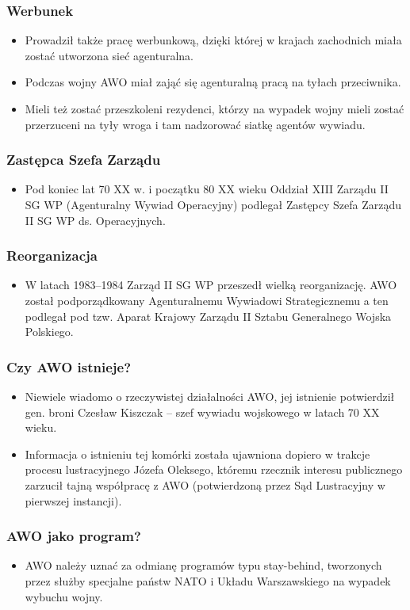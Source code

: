 \documentclass[]{beamer}
\begin{document}
\frame
{
\frametitle{Werbunek}
\begin{itemize}
\item  Prowadził także pracę werbunkową, dzięki której w krajach zachodnich miała zostać utworzona sieć agenturalna.
\item Podczas wojny AWO miał zająć się agenturalną pracą na tyłach przeciwnika.
\item Mieli też zostać przeszkoleni rezydenci, którzy na wypadek wojny mieli zostać przerzuceni na tyły wroga i tam nadzorować siatkę agentów wywiadu.
\end{itemize}
}



\frame
{
\frametitle{Zastępca Szefa Zarządu}
\begin{itemize}
\item Pod koniec lat 70 XX w. i początku 80 XX wieku Oddział XIII Zarządu II SG WP (Agenturalny Wywiad Operacyjny) podlegał Zastępcy Szefa Zarządu II SG WP ds. Operacyjnych.
\end{itemize}
}



\frame
{
\frametitle{Reorganizacja}
\begin{itemize}
\item W latach 1983–1984 Zarząd II SG WP przeszedł wielką reorganizację. AWO został podporządkowany Agenturalnemu Wywiadowi Strategicznemu a ten podlegał pod tzw. Aparat Krajowy Zarządu II Sztabu Generalnego Wojska Polskiego.
\end{itemize}
}



\frame
{
\frametitle{Czy AWO istnieje?}
\begin{itemize}
\item Niewiele wiadomo o rzeczywistej działalności AWO, jej istnienie potwierdził gen. broni Czesław Kiszczak – szef wywiadu wojskowego w latach 70 XX wieku.
\item Informacja o istnieniu tej komórki została ujawniona dopiero w trakcje procesu lustracyjnego Józefa Oleksego, któremu rzecznik interesu publicznego zarzucił tajną współpracę z AWO (potwierdzoną przez Sąd Lustracyjny w pierwszej instancji).
\end{itemize}
}



\frame
{
\frametitle{AWO jako program?}
\begin{itemize}
\item AWO należy uznać za odmianę programów typu stay-behind, tworzonych przez służby specjalne państw NATO i Układu Warszawskiego na wypadek wybuchu wojny.
\end{itemize}
}
\end{document}
